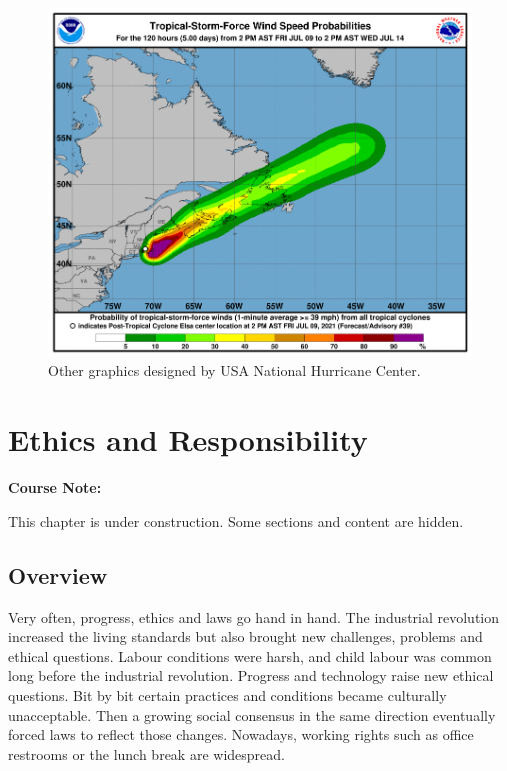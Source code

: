 \documentclass[
]{book}
\begin{document}
\begin{figure}

{\centering \includegraphics[width=0.66\linewidth]{Figures/hurricane-forecast-heat-map} 

}

\caption{Other graphics designed by USA National Hurricane Center.}\label{fig:hurricane-heatmap}
\end{figure}

\hypertarget{ethics-and-responsibility}{%
\chapter{Ethics and Responsibility}\label{ethics-and-responsibility}}

\begin{notebox}

\begin{center}
\textbf{Course Note:}

\end{center}

This chapter is under construction. Some sections and content are hidden.

\end{notebox}

\hypertarget{overview-2}{%
\section{Overview}\label{overview-2}}

Very often, progress, ethics and laws go hand in hand. The industrial revolution increased the living standards but also brought new challenges, problems and ethical questions. Labour conditions were harsh, and child labour was common long before the industrial revolution. Progress and technology raise new ethical questions. Bit by bit certain practices and conditions became culturally unacceptable. Then a growing social consensus in the same direction eventually forced laws to reflect those changes. Nowadays, working rights such as office restrooms or the lunch break are widespread.
\end{document}
